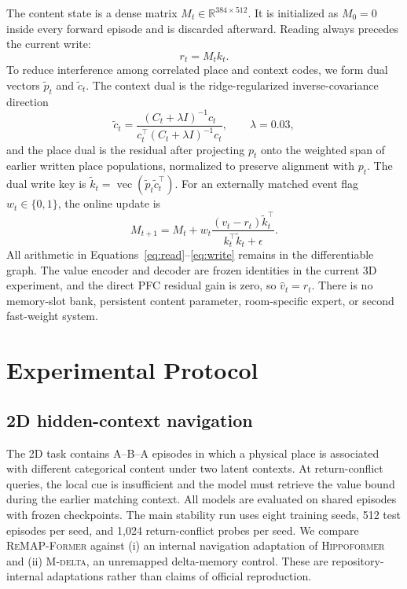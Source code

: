\documentclass{article}
\newcommand{\model}{\textsc{ReMAP-Former}}
\newcommand{\hippo}{\textsc{Hippoformer}}
\newcommand{\mdelta}{\textsc{M-delta}}
\newcommand{\pfc}{\textsc{PFC}}
\begin{document}
The content state is a dense matrix $M_t\in\mathbb{R}^{384\times512}$.
It is initialized as $M_0=0$ inside every forward episode and is discarded afterward.
Reading always precedes the current write:
\begin{equation}
  r_t=M_t k_t.
  \label{eq:read}
\end{equation}
To reduce interference among correlated place and context codes, we form dual vectors $\tilde p_t$ and $\tilde c_t$.
The context dual is the ridge-regularized inverse-covariance direction
\begin{equation}
  \tilde c_t =
  \frac{(C_t+\lambda I)^{-1}c_t}
  {c_t^\top(C_t+\lambda I)^{-1}c_t},
  \qquad \lambda=0.03,
\end{equation}
and the place dual is the residual after projecting $p_t$ onto the weighted span of earlier written place populations, normalized to preserve alignment with $p_t$.
The dual write key is $\tilde k_t=\operatorname{vec}(\tilde p_t\tilde c_t^\top)$.
For an externally matched event flag $w_t\in\{0,1\}$, the online update is
\begin{equation}
  M_{t+1}
  =
  M_t+
  w_t
  \frac{(v_t-r_t)\tilde k_t^\top}
       {k_t^\top\tilde k_t+\epsilon}.
  \label{eq:write}
\end{equation}
All arithmetic in Equations~\ref{eq:read}--\ref{eq:write} remains in the differentiable graph.
The value encoder and decoder are frozen identities in the current 3D experiment, and the direct \pfc{} residual gain is zero, so $\hat v_t=r_t$.
There is no memory-slot bank, persistent content parameter, room-specific expert, or second fast-weight system.

\section{Experimental Protocol}
\label{sec:experiments}

\subsection{2D hidden-context navigation}

The 2D task contains A--B--A episodes in which a physical place is associated with different categorical content under two latent contexts.
At return-conflict queries, the local cue is insufficient and the model must retrieve the value bound during the earlier matching context.
All models are evaluated on shared episodes with frozen checkpoints.
The main stability run uses eight training seeds, 512 test episodes per seed, and 1,024 return-conflict probes per seed.
We compare \model{} against (i) an internal navigation adaptation of \hippo{} and (ii) \mdelta, an unremapped delta-memory control.
These are repository-internal adaptations rather than claims of official reproduction.
\end{document}
